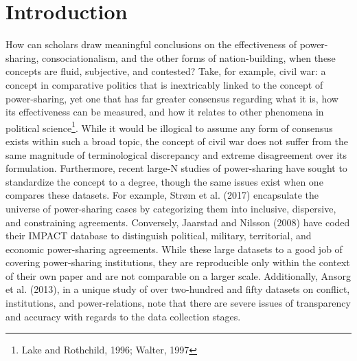 \documentclass[12pt]{article}
\begin{document}


\pagebreak


\doublespacing

\section{Introduction}
How can scholars draw meaningful conclusions on the effectiveness of power-sharing, consociationalism, and the other forms of nation-building, when these concepts are fluid, subjective, and contested? Take, for example, civil war: a concept in comparative politics that is inextricably linked to the concept of power-sharing, yet one that has far greater consensus regarding what it is, how its effectiveness can be measured, and how it relates to other phenomena in political science\footnote{Lake and Rothchild, 1996; Walter, 1997}. While it would be illogical to assume any form of consensus exists within such a broad topic, the concept of civil war does not suffer from the same magnitude of terminological discrepancy and extreme disagreement over its formulation. Furthermore, recent large-N studies of power-sharing have sought to standardize the concept to a degree, though the same issues exist when one compares these datasets. For example, Strøm et al. (2017) encapsulate the universe of power-sharing cases by categorizing them into inclusive, dispersive, and constraining agreements. Conversely, Jaarstad and Nilsson (2008) have coded their IMPACT database to distinguish political, military, territorial, and economic power-sharing agreements. While these large datasets to a good job of covering power-sharing institutions, they are reproducible only within the context of their own paper and are not comparable on a larger scale. Additionally, Ansorg et al. (2013), in a unique study of over two-hundred and fifty datasets on conflict, institutions, and power-relations, note that there are severe issues of transparency and accuracy with regards to the data collection stages.
\end{document}
